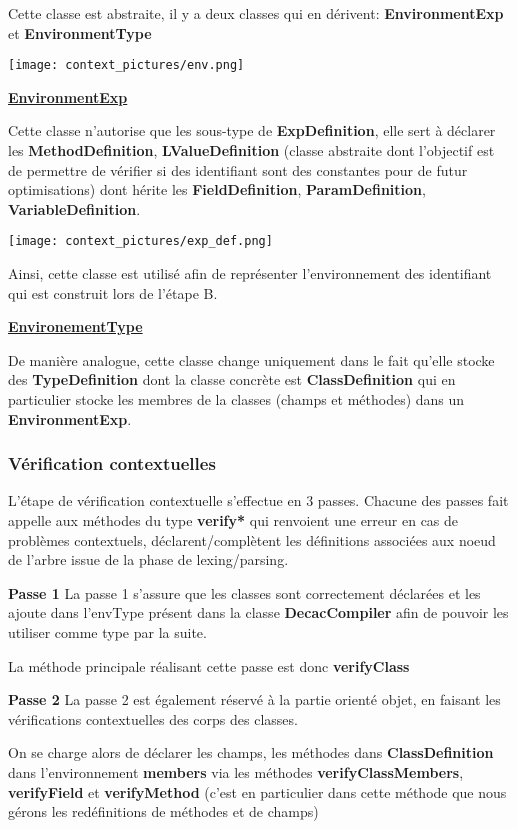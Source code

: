 \documentclass[12pt, a4paper, one side]{article}
\begin{document}
    Cette classe est abstraite, il y a deux classes qui en dérivent: \textbf{EnvironmentExp} et \textbf{EnvironmentType}

    \texttt{[image: context\_pictures/env.png]}

    \textbf{\underline{EnvironmentExp}}

    Cette classe n'autorise que les sous-type de \textbf{ExpDefinition}, elle sert à déclarer les \textbf{MethodDefinition}, \textbf{LValueDefinition} (classe abstraite dont l'objectif est de permettre de vérifier si des identifiant sont des constantes pour de futur optimisations) dont hérite les \textbf{FieldDefinition}, \textbf{ParamDefinition}, \textbf{VariableDefinition}.

    \texttt{[image: context\_pictures/exp\_def.png]}

    Ainsi, cette classe est utilisé afin de représenter l'environnement des identifiant qui est construit lors de l'étape B.

    \textbf{\underline{EnvironementType}}

    De manière analogue, cette classe change uniquement dans le fait qu'elle stocke des \textbf{TypeDefinition} dont la classe concrète est \textbf{ClassDefinition} qui en particulier stocke les membres de la classes (champs et méthodes) dans un \textbf{EnvironmentExp}.

    \subsubsection{Vérification contextuelles}

    L'étape de vérification contextuelle s'effectue en 3 passes.
    Chacune des passes fait appelle aux méthodes du type \textbf{verify*}
    qui renvoient une erreur en cas de problèmes contextuels, déclarent/complètent les définitions associées aux noeud de l'arbre issue de la phase de lexing/parsing.

    \textbf{Passe 1}
    La passe 1 s'assure que les classes sont correctement déclarées et les ajoute dans l'envType présent dans la classe \textbf{DecacCompiler} afin de pouvoir les utiliser comme type par la suite.

    La méthode principale réalisant cette passe est donc \textbf{verifyClass}

    \textbf{Passe 2}
    La passe 2 est également réservé à la partie orienté objet, en faisant les vérifications contextuelles des corps des classes.

    On se charge alors de déclarer les champs, les méthodes dans
    \textbf{ClassDefinition} dans l'environnement \textbf{members} via les
    méthodes \textbf{verifyClassMembers}, \textbf{verifyField} et
    \textbf{verifyMethod} (c'est en particulier dans cette méthode que nous
    gérons les redéfinitions de méthodes et de champs)
\end{document}
